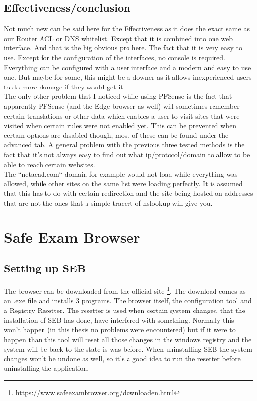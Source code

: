 \subsection{Effectiveness/conclusion}
Not much new can be said here for the Effectiveness as it does the exact same as our Router ACL or DNS whitelist. Except that it is combined into one web interface. And that is the big obvious pro here. The fact that it is very easy to use. Except for the configuration of the interfaces, no console is required. Everything can be configured with a user interface and a modern and easy to use one. But maybe for some, this might be a downer as it allows inexperienced users to do more damage if they would get it.\\

The only other problem that I noticed while using PFSense is the fact that apparently PFSense (and the Edge browser as well) will sometimes remember certain translations or other data which enables a user to visit sites that were visited when certain rules were not enabled yet. This can be prevented when certain options are disabled though, most of these can be found under the advanced tab. A general problem with the previous three tested methods is the fact that it's not always easy to find out what ip/protocol/domain to allow to be able to reach certain websites.\\

 The ``netacad.com`` domain for example would not load while everything was allowed, while other sites on the same list were loading perfectly. It is assumed that this has to do with certain redirection and the site being hosted on addresses that are not the ones that a simple tracert of nslookup will give you. 
\section{Safe Exam Browser}
\subsection{Setting up SEB}
The browser can be downloaded from the official site \footnote{https://www.safeexambrowser.org/download\textunderscore en.html}. The download comes as an .exe file and installs 3 programs. The browser itself, the configuration tool and a Registry Resetter. The resetter is used when certain system changes, that the installation of SEB has done, have interfered with something. Normally this won't happen (in this thesis no problems were encountered) but if it were to happen than this tool will reset all those changes in the windows registry and the system will be back to the state is was before. When uninstalling SEB the system changes won't be undone as well, so it's a good idea to run the resetter before uninstalling the application.\\

